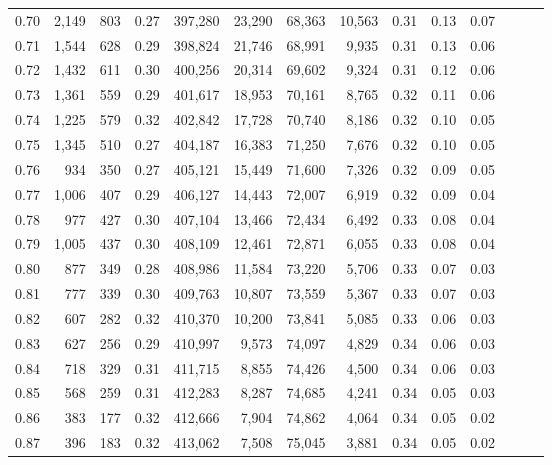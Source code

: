 \begin{tabular}{rrrrrrrrrrrrrr}
0.70 &   2,149 &    803 &  0.27 &  397,280 &   23,290 &  68,363 &  10,563 &  0.31 &  0.13 &      0.07 \\
0.71 &   1,544 &    628 &  0.29 &  398,824 &   21,746 &  68,991 &   9,935 &  0.31 &  0.13 &      0.06 \\
0.72 &   1,432 &    611 &  0.30 &  400,256 &   20,314 &  69,602 &   9,324 &  0.31 &  0.12 &      0.06 \\
0.73 &   1,361 &    559 &  0.29 &  401,617 &   18,953 &  70,161 &   8,765 &  0.32 &  0.11 &      0.06 \\
0.74 &   1,225 &    579 &  0.32 &  402,842 &   17,728 &  70,740 &   8,186 &  0.32 &  0.10 &      0.05 \\
0.75 &   1,345 &    510 &  0.27 &  404,187 &   16,383 &  71,250 &   7,676 &  0.32 &  0.10 &      0.05 \\
0.76 &     934 &    350 &  0.27 &  405,121 &   15,449 &  71,600 &   7,326 &  0.32 &  0.09 &      0.05 \\
0.77 &   1,006 &    407 &  0.29 &  406,127 &   14,443 &  72,007 &   6,919 &  0.32 &  0.09 &      0.04 \\
0.78 &     977 &    427 &  0.30 &  407,104 &   13,466 &  72,434 &   6,492 &  0.33 &  0.08 &      0.04 \\
0.79 &   1,005 &    437 &  0.30 &  408,109 &   12,461 &  72,871 &   6,055 &  0.33 &  0.08 &      0.04 \\
0.80 &     877 &    349 &  0.28 &  408,986 &   11,584 &  73,220 &   5,706 &  0.33 &  0.07 &      0.03 \\
0.81 &     777 &    339 &  0.30 &  409,763 &   10,807 &  73,559 &   5,367 &  0.33 &  0.07 &      0.03 \\
0.82 &     607 &    282 &  0.32 &  410,370 &   10,200 &  73,841 &   5,085 &  0.33 &  0.06 &      0.03 \\
0.83 &     627 &    256 &  0.29 &  410,997 &    9,573 &  74,097 &   4,829 &  0.34 &  0.06 &      0.03 \\
0.84 &     718 &    329 &  0.31 &  411,715 &    8,855 &  74,426 &   4,500 &  0.34 &  0.06 &      0.03 \\
0.85 &     568 &    259 &  0.31 &  412,283 &    8,287 &  74,685 &   4,241 &  0.34 &  0.05 &      0.03 \\
0.86 &     383 &    177 &  0.32 &  412,666 &    7,904 &  74,862 &   4,064 &  0.34 &  0.05 &      0.02 \\
0.87 &     396 &    183 &  0.32 &  413,062 &    7,508 &  75,045 &   3,881 &  0.34 &  0.05 &      0.02 \\

\end{tabular}
